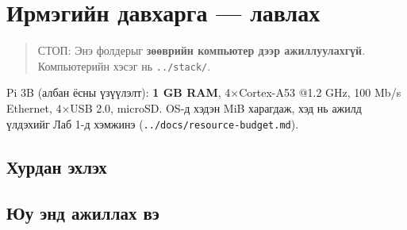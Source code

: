 \chapter{Ирмэгийн давхарга — лавлах}

\begin{quote}
СТОП: Энэ фолдерыг \textbf{зөөврийн компьютер дээр ажиллуулахгүй}. Компьютерийн хэсэг нь \texttt{../stack/}.
\end{quote}

Pi 3B (албан ёсны үзүүлэлт): \textbf{1 GB RAM}, 4×Cortex-A53 @1.2 GHz, 100 Mb/s Ethernet, 4×USB 2.0, microSD. OS-д хэдэн MiB харагдаж, хэд нь ажилд үлдэхийг Лаб 1-д хэмжинэ (\texttt{.\allowbreak{}.\allowbreak{}/\allowbreak{}docs/\allowbreak{}resource-budget.\allowbreak{}md}).

\hypertarget{ux445ux443ux440ux434ux430ux43d-ux44dux445ux43bux44dux445}{%
\section{Хурдан эхлэх}\label{ux445ux443ux440ux434ux430ux43d-ux44dux445ux43bux44dux445}}

\begin{Shaded}
\begin{Highlighting}[]
\end{Highlighting}
\end{Shaded}

\hypertarget{ux44eux443-ux44dux43dux434-ux430ux436ux438ux43bux43bux430ux445-ux432ux44d}{%
\section{Юу энд ажиллах вэ}\label{ux44eux443-ux44dux43dux434-ux430ux436ux438ux43bux43bux430ux445-ux432ux44d}}

